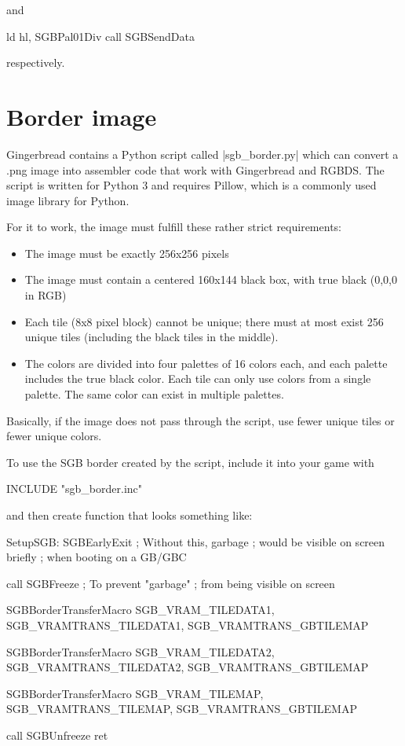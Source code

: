 \documentclass[11pt]{book}
\begin{document}
and

\begin{code}
ld hl, SGBPal01Div
call SGBSendData
\end{code}

respectively.

\section{Border image} 
Gingerbread contains a Python script called |sgb_border.py| which can convert a .png image into assembler code that work with Gingerbread and RGBDS. The script is written for Python 3 and requires Pillow, which is a commonly used image library for Python.

For it to work, the image must fulfill these rather strict requirements:

\begin{itemize}
\item The image must be exactly 256x256 pixels 
\item The image must contain a centered 160x144 black box, with true black (0,0,0 in RGB)
\item Each tile (8x8 pixel block) cannot be unique; there must at most exist 256 unique tiles (including the black tiles in the middle). 
\item The colors are divided into four palettes of 16 colors each, and each palette includes the true black color. Each tile can only use colors from a single palette. The same color can exist in multiple palettes.
\end{itemize}

Basically, if the image does not pass through the script, use fewer unique tiles or fewer unique colors. 

To use the SGB border created by the script, include it into your game with

\begin{code}
INCLUDE "sgb_border.inc"
\end{code}

and then create function that looks something like:

\begin{code}
SetupSGB:
 SGBEarlyExit ; Without this, garbage
 ; would be visible on screen briefly
 ; when booting on a GB/GBC
 
 call SGBFreeze ; To prevent "garbage" 
 ; from being visible on screen
 
    SGBBorderTransferMacro SGB_VRAM_TILEDATA1,
    	 SGB_VRAMTRANS_TILEDATA1,
    	 SGB_VRAMTRANS_GBTILEMAP

    SGBBorderTransferMacro SGB_VRAM_TILEDATA2,
    	 SGB_VRAMTRANS_TILEDATA2,
    	 SGB_VRAMTRANS_GBTILEMAP

    SGBBorderTransferMacro SGB_VRAM_TILEMAP, 
    	 SGB_VRAMTRANS_TILEMAP,
    	 SGB_VRAMTRANS_GBTILEMAP  
    
 call SGBUnfreeze
 ret
\end{code}
\end{document}
